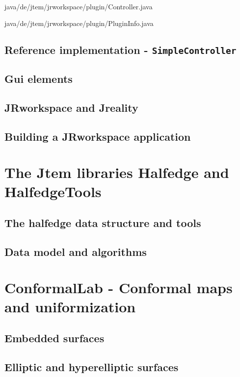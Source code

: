  {java/de/jtem/jrworkspace/plugin/Controller.java}

 {java/de/jtem/jrworkspace/plugin/PluginInfo.java}




\subsection{Reference implementation - {\tt SimpleController}}

\subsection{Gui elements}
\subsection{{\sc JRworkspace} and {\sc Jreality}}
\subsection{Building a {\sc JRworkspace} application}

\section{The {\sc Jtem} libraries {\sc Halfedge} and {\sc HalfedgeTools}}
\label{sec:halfedge_halfedgetools}
\subsection{The halfedge data structure and tools}
\subsection{Data model and algorithms}

\section{{\sc ConformalLab} - Conformal maps and uniformization}
\label{sec:conformallab}
\subsection{Embedded surfaces}
\subsection{Elliptic and hyperelliptic surfaces}
